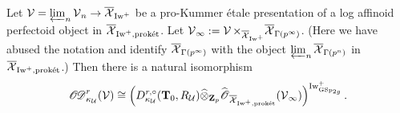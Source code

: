\begin{Lemma}\label{Lemma: Explicit description of the sheaf OD}
Let $\calV=\varprojlim_{n}\calV_n\rightarrow \overline{\calX}_{\Iw^+}$ be a pro-Kummer \'{e}tale presentation of a log affinoid perfectoid object in $\overline{\calX}_{\Iw^+, \proket}$. Let $\calV_{\infty}:=\calV\times_{\overline{\calX}_{\Iw^+}}\overline{\calX}_{\Gamma(p^{\infty})}$. (Here we have abused the notation and identify $\overline{\calX}_{\Gamma(p^{\infty})}$ with the object $\varprojlim_n \overline{\calX}_{\Gamma(p^n)}$ in $\overline{\calX}_{\Iw^+, \proket}$.) Then there is a natural isomorphism $$\sheafOD_{\kappa_{\calU}}^r(\calV)\cong\left(D_{\kappa_{\calU}}^{r, \circ}(\T_0, R_{\calU})\widehat{\otimes}_{\Z_p}\widehat{\scrO}_{\overline{\calX}_{\Iw^+, \proket}}(\calV_{\infty})\right)^{\Iw^+_{\GSp_{2g}}}.$$
\end{Lemma}
